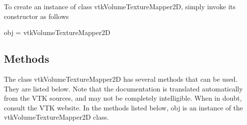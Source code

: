 To create an instance of class vtk\-Volume\-Texture\-Mapper2\-D, simply invoke its constructor as follows \begin{DoxyVerb}  obj = vtkVolumeTextureMapper2D
\end{DoxyVerb}
 \hypertarget{vtkwidgets_vtkxyplotwidget_Methods}{}\subsection{Methods}\label{vtkwidgets_vtkxyplotwidget_Methods}
The class vtk\-Volume\-Texture\-Mapper2\-D has several methods that can be used. They are listed below. Note that the documentation is translated automatically from the V\-T\-K sources, and may not be completely intelligible. When in doubt, consult the V\-T\-K website. In the methods listed below, {\ttfamily obj} is an instance of the vtk\-Volume\-Texture\-Mapper2\-D class. 
